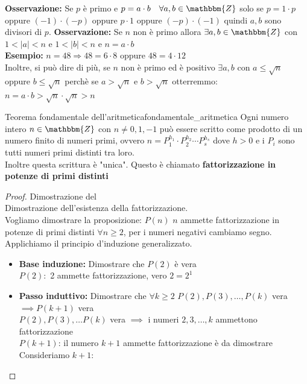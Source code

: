 \documentclass[12pt, letterpaper]{report}
\newcounter{theorem}
\newcommand{\namerefl}[1]{%
	\bgroup
	\let\nmu\MakeLowercase
	\nameref{#1}\egroup}
\newcommand{\nmu}{}
\begin{document}
		\textbf{Osservazione:} Se $p$ è primo e $p = a \cdot b \quad \forall a,b \in \mathbbm{Z}$ solo se $p = 1 \cdot p$ oppure $(-1) \cdot (-p)$ oppure $p \cdot 1$ oppure $(-p) \cdot (-1)$ quindi $a,b$ sono divisori di $p$.
		\textbf{Osservazione:} Se $n$ non è primo allora $\exists a,b \in \mathbbm{Z}$ con $1 < |a| < n$ e $1 < |b| < n$ e $n = a \cdot b$ \\
		\textbf{Esempio:} $n = 48 \Rightarrow 48 = 6 \cdot 8$ oppure $48 = 4 \cdot 12$ \\
		Inoltre, si può dire di più, se $n$ non è primo ed è positivo $\exists a,b$ con $a \leq \sqrt{n}$ oppure $b \leq \sqrt{n}$ perchè se $a > \sqrt{n}$ e $b > \sqrt{n}$ otterremmo: $n= a \cdot b > \sqrt{n} \cdot \sqrt{n} > n$ \\
		\begin{theorem}{\nmu Teorema fondamentale dell'aritmetica}{fondamentale_aritmetica}
			Ogni numero intero $n \in \mathbbm{Z}$ con $n \neq 0, 1, -1$ può essere scritto come prodotto di un numero finito di numeri primi, ovvero $n = P_1^{h_1} \cdot P_2^{h_2} \cdots P_s^{h_s}$ dove $h > 0$ e i $P_i$ sono tutti numeri primi distinti tra loro. \\
			Inoltre questa scrittura è "unica". Questo è chiamato \textbf{fattorizzazione in potenze di primi distinti}
			\begin{proof}{Dimostrazione del \namerefl{th:fondamentale_aritmetica}} \quad \\
				Dimostrazione dell'esistenza della fattorizzazione. \\
				Vogliamo dimostrare la proposizione: $P(n)$ $n$ ammette fattorizzazione in potenze di primi distinti $\forall n \geq 2$, per i numeri negativi cambiamo segno. \\
				Applichiamo il principio d'induzione generalizzato.
				\begin{itemize}
					\item \textbf{Base induzione:} Dimostrare che $P(2)$ è vera \\
					$P(2):$ 2 ammette fattorizzazione, vero $2 = 2^1$
					\item \textbf{Passo induttivo:} Dimostrare che $\forall k \geq 2$ $P(2), P(3), \dots, P(k)$ vera $\implies P(k + 1)$ vera \\
					$P(2), P(3), \dots P(k)$ vera $\implies$ i numeri $2,3, \dots, k$ ammettono fattorizzazione \\
					$P(k + 1)$: il numero $k + 1$ ammette fattorizzazione è da dimostrare \\
					Consideriamo $k + 1$:

\end{itemize}
\end{proof}
\end{theorem}
\end{document}
